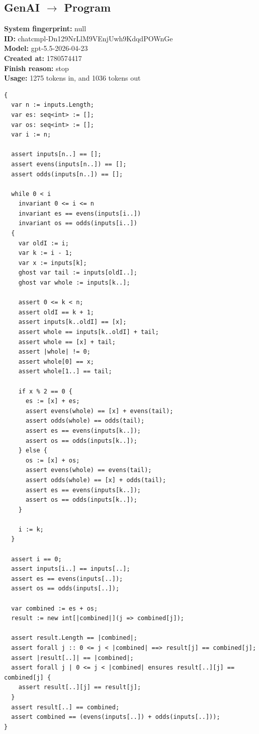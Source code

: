 \documentclass{article}
\begin{document}
\subsection*{GenAI $\rightarrow$ Program}
\textbf{System fingerprint: }null
\\\textbf{ID: }chatcmpl-Dn129NrLlM9VEnjUwh9KdqdPOWnGe
\\\textbf{Model: }gpt-5.5-2026-04-23
\\\textbf{Created at: }1780574417
\\\textbf{Finish reason: }stop
\\\textbf{Usage: }1275 tokens in, and 1036 tokens out
\begin{lstlisting}
{
  var n := inputs.Length;
  var es: seq<int> := [];
  var os: seq<int> := [];
  var i := n;

  assert inputs[n..] == [];
  assert evens(inputs[n..]) == [];
  assert odds(inputs[n..]) == [];

  while 0 < i
    invariant 0 <= i <= n
    invariant es == evens(inputs[i..])
    invariant os == odds(inputs[i..])
  {
    var oldI := i;
    var k := i - 1;
    var x := inputs[k];
    ghost var tail := inputs[oldI..];
    ghost var whole := inputs[k..];

    assert 0 <= k < n;
    assert oldI == k + 1;
    assert inputs[k..oldI] == [x];
    assert whole == inputs[k..oldI] + tail;
    assert whole == [x] + tail;
    assert |whole| != 0;
    assert whole[0] == x;
    assert whole[1..] == tail;

    if x % 2 == 0 {
      es := [x] + es;
      assert evens(whole) == [x] + evens(tail);
      assert odds(whole) == odds(tail);
      assert es == evens(inputs[k..]);
      assert os == odds(inputs[k..]);
    } else {
      os := [x] + os;
      assert evens(whole) == evens(tail);
      assert odds(whole) == [x] + odds(tail);
      assert es == evens(inputs[k..]);
      assert os == odds(inputs[k..]);
    }

    i := k;
  }

  assert i == 0;
  assert inputs[i..] == inputs[..];
  assert es == evens(inputs[..]);
  assert os == odds(inputs[..]);

  var combined := es + os;
  result := new int[|combined|](j => combined[j]);

  assert result.Length == |combined|;
  assert forall j :: 0 <= j < |combined| ==> result[j] == combined[j];
  assert |result[..]| == |combined|;
  assert forall j | 0 <= j < |combined| ensures result[..][j] == combined[j] {
    assert result[..][j] == result[j];
  }
  assert result[..] == combined;
  assert combined == (evens(inputs[..]) + odds(inputs[..]));
}
\end{lstlisting}
\end{document}

